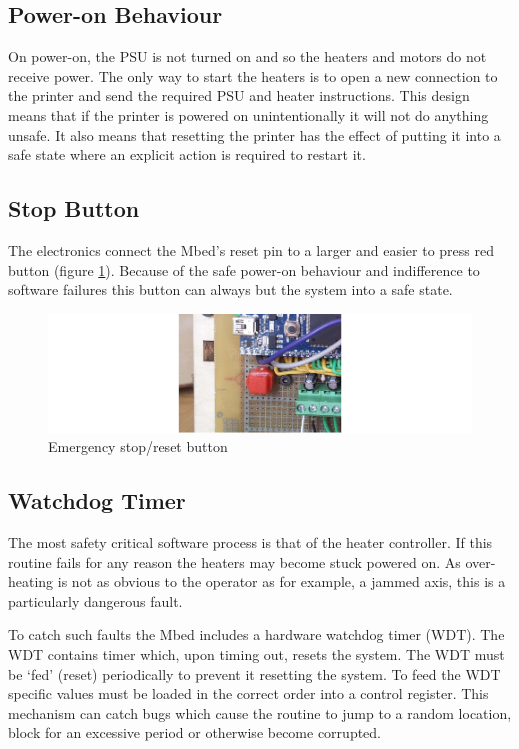 		\subsection{Power-on Behaviour}
			
			On power-on, the PSU is not turned on and so the heaters and motors do not
			receive power. The only way to start the heaters is to open a new
			connection to the printer and send the required PSU and heater
			instructions. This design means that if the printer is powered on
			unintentionally it will not do anything unsafe. It also means that
			resetting the printer has the effect of putting it into a safe state where
			an explicit action is required to restart it.
		
		\subsection{Stop Button}
			
			The electronics connect the Mbed's reset pin to a larger and easier to
			press red button (figure \ref{fig:stop}). Because of the safe power-on
			behaviour and indifference to software failures this button can always but
			the system into a safe state.
			
			\begin{figure}
				\includegraphics[width=1\textwidth]{diagrams/stop.pdf}
				\caption{Emergency stop/reset button}
				\label{fig:stop}
			\end{figure}
		
		\subsection{Watchdog Timer}
			
			The most safety critical software process is that of the heater
			controller. If this routine fails for any reason the heaters may become
			stuck powered on. As over-heating is not as obvious to the operator as for
			example, a jammed axis, this is a particularly dangerous fault.
			
			To catch such faults the Mbed includes a hardware watchdog timer (WDT).
			The WDT contains timer which, upon timing out, resets the system. The WDT
			must be `fed' (reset) periodically to prevent it resetting the system. To
			feed the WDT specific values must be loaded in the correct order into a
			control register. This mechanism can catch bugs which cause the routine to
			jump to a random location, block for an excessive period or otherwise
			become corrupted.
			
